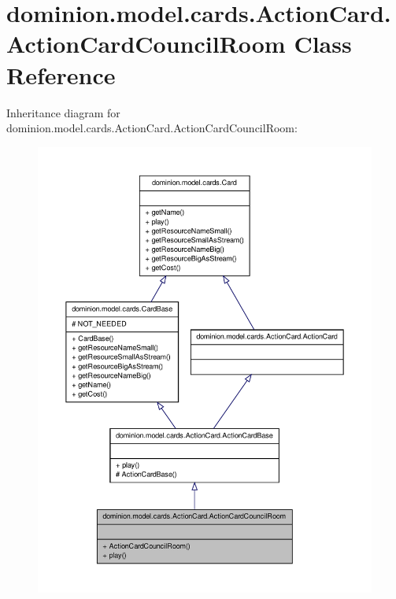 \hypertarget{classdominion_1_1model_1_1cards_1_1ActionCard_1_1ActionCardCouncilRoom}{\section{dominion.\-model.\-cards.\-Action\-Card.\-Action\-Card\-Council\-Room \-Class \-Reference}
\label{classdominion_1_1model_1_1cards_1_1ActionCard_1_1ActionCardCouncilRoom}
}


\-Inheritance diagram for dominion.\-model.\-cards.\-Action\-Card.\-Action\-Card\-Council\-Room\-:
\nopagebreak
\begin{figure}[H]
\begin{center}
\leavevmode
\includegraphics[width=350pt]{classdominion_1_1model_1_1cards_1_1ActionCard_1_1ActionCardCouncilRoom__inherit__graph}
\end{center}
\end{figure}


